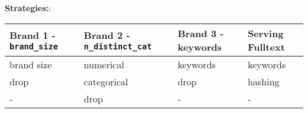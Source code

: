 \documentclass[
]{article}
\begin{document}
\textbf{Strategies:}:

\begin{longtable}[]{@{}llll@{}}
\toprule
\begin{minipage}[b]{0.22\columnwidth}\raggedright
Brand 1 - \texttt{brand\_size}\strut
\end{minipage} & \begin{minipage}[b]{0.22\columnwidth}\raggedright
Brand 2 - \texttt{n\_distinct\_cat}\strut
\end{minipage} & \begin{minipage}[b]{0.22\columnwidth}\raggedright
Brand 3 - keywords\strut
\end{minipage} & \begin{minipage}[b]{0.22\columnwidth}\raggedright
Serving Fulltext\strut
\end{minipage}\tabularnewline
\midrule
\endhead
\begin{minipage}[t]{0.22\columnwidth}\raggedright
brand size\strut
\end{minipage} & \begin{minipage}[t]{0.22\columnwidth}\raggedright
numerical\strut
\end{minipage} & \begin{minipage}[t]{0.22\columnwidth}\raggedright
keywords\strut
\end{minipage} & \begin{minipage}[t]{0.22\columnwidth}\raggedright
keywords\strut
\end{minipage}\tabularnewline
\begin{minipage}[t]{0.22\columnwidth}\raggedright
drop\strut
\end{minipage} & \begin{minipage}[t]{0.22\columnwidth}\raggedright
categorical\strut
\end{minipage} & \begin{minipage}[t]{0.22\columnwidth}\raggedright
drop\strut
\end{minipage} & \begin{minipage}[t]{0.22\columnwidth}\raggedright
hashing\strut
\end{minipage}\tabularnewline
\begin{minipage}[t]{0.22\columnwidth}\raggedright
-\strut
\end{minipage} & \begin{minipage}[t]{0.22\columnwidth}\raggedright
drop\strut
\end{minipage} & \begin{minipage}[t]{0.22\columnwidth}\raggedright
-\strut
\end{minipage} & \begin{minipage}[t]{0.22\columnwidth}\raggedright
-\strut
\end{minipage}\tabularnewline
\bottomrule
\end{longtable}
\end{document}
